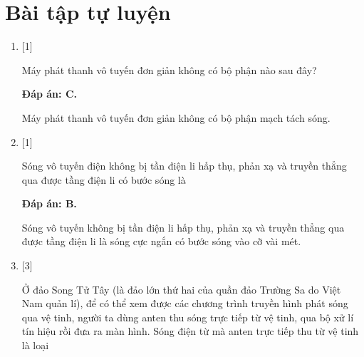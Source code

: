 \section{Bài tập tự luyện}
\begin{enumerate}[label=\bfseries Câu \arabic*:]
	
	\item {} [1]
	
	{Máy phát thanh vô tuyến đơn giản không có bộ phận nào sau đây?
	}
	
	\hideall
	{		\textbf{Đáp án: C.}
		
		Máy phát thanh vô tuyến đơn giản không có bộ phận mạch tách sóng.
	} 
	
	\item {} [1]
	
	{Sóng vô tuyến điện không bị tần điện li hấp thụ, phản xạ và truyền thẳng qua được tầng điện li có bước sóng là
	}
	
	\hideall
	{		\textbf{Đáp án: B.}
		
		Sóng vô tuyến không bị tần điện li hấp thụ, phản xạ và truyền thẳng qua được tầng điện li là sóng cực ngắn có bước sóng vào cỡ vài mét.
		
	}
	
	\item {} [3]
	
	{Ở đảo Song Tử Tây (là đảo lớn thứ hai của quần đảo Trường Sa do Việt Nam quản lí), để có thể xem được các chương trình truyền hình phát sóng qua vệ tinh, người ta dùng anten thu sóng trực tiếp từ vệ tinh, qua bộ xử lí tín hiệu rồi đưa ra màn hình. Sóng điện từ mà anten trực tiếp thu từ vệ tinh là loại 
	}
	

\end{enumerate}
